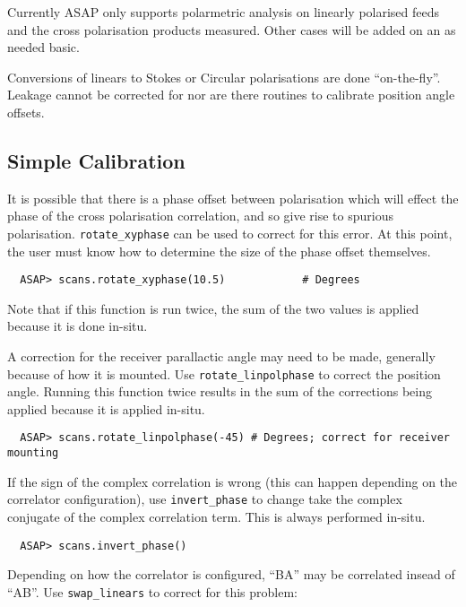 \documentclass[11pt]{article}
\newcommand{\cmd}[1]{{\tt #1}}
\begin{document}
Currently ASAP only supports polarmetric analysis
on linearly polarised feeds and the cross polarisation products
measured. Other cases will be added on an as needed basic.

Conversions of linears to Stokes or Circular polarisations are done
``on-the-fly''. Leakage cannot be corrected for nor are there routines
to calibrate position angle offsets.

\subsection{Simple Calibration}

It is possible that there is a phase
offset between polarisation which will effect the phase of the cross
polarisation correlation, and so give rise to spurious
polarisation. \cmd{rotate\_xyphase} can be used to correct for this
error. At this point, the user must know how to determine the size of
the phase offset themselves.

\begin{verbatim}
  ASAP> scans.rotate_xyphase(10.5)            # Degrees
\end{verbatim}

Note that if this function is run twice, the sum of the two values is
applied because it is done in-situ.

A correction for the receiver parallactic angle may need to be made,
generally because of how it is mounted. Use \cmd{rotate\_linpolphase}
to correct the position angle. Running this function twice results in
the sum of the corrections being applied because it is applied
in-situ.

\begin{verbatim}
  ASAP> scans.rotate_linpolphase(-45) # Degrees; correct for receiver mounting
\end{verbatim}

If the sign of the complex correlation is wrong (this can happen
depending on the correlator configuration), use \cmd{invert\_phase} to
change take the complex conjugate of the complex correlation
term. This is always performed in-situ.

\begin{verbatim}
  ASAP> scans.invert_phase()
\end{verbatim}

Depending on how the correlator is configured, ``BA'' may be
correlated insead of ``AB''. Use \cmd{swap\_linears} to correct for
this problem:
\end{document}
